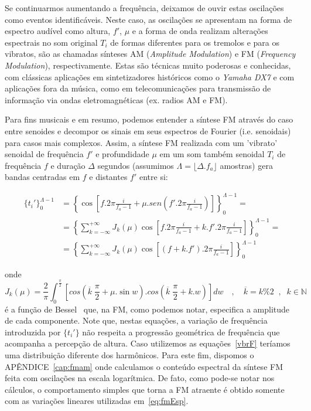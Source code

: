Se continuarmos aumentando a frequência, deixamos de ouvir estas oscilações
como eventos identificáveis. Neste caso, as oscilações se apresentam na forma de espectro
audível como altura, $f'$, $\mu$ e a forma de onda realizam alterações espectrais no som
original $T_i$ de formas diferentes para os tremolos e para os vibratos, são as 
chamadas sínteses AM (\emph{Amplitude Modulation}) e FM (\emph{Frequency Modulation}), respectivamente.
Estas são técnicas muito poderosas e conhecidas, com clássicas aplicações em sintetizadores
históricos como o \emph{Yamaha DX7} e com aplicações fora da música, como em telecomunicações para transmissão de informação via ondas eletromagnéticas (ex. radios AM e FM).

Para fins musicais e em resumo, podemos entender a síntese FM através do caso entre senoides
e decompor os sinais em seus espectros de Fourier (i.e. senoidais) para casos mais complexos.
Assim, a síntese FM realizada com um 'vibrato' senoidal de frequência $f'$ e profundidade $\mu$ em um som também senoidal $T_i$ de frequência $f$
e duração $\Delta$ segundos (assumimos $\Lambda = \lfloor \Delta . f_a \rfloor $ amostras)
gera bandas centradas em $f$ e distantes $f'$ entre si:

\begin{equation}\label{eq:fmEsp}
\begin{split}
\{t_i'\}_0^{\Lambda -1} & = \left \{ \cos \left [f . 2 \pi \frac{i}{f_a-1} + \mu . sen \left ( f' . 2 \pi \frac{i}{ f_a -1 } \right ) \right ] \right \}_0^{\Lambda-1}  = \\
 & = \left \{ \sum_{k=-\infty}^{+\infty} J_k(\mu) \cos \left [ f . 2 \pi \frac{i}{f_a-1} + k . f' . 2 \pi \frac{i}{f_a-1} \right ]  \right \}_0^{\Lambda-1} = \\
 & = \left \{ \sum_{k=-\infty}^{+\infty} J_k(\mu) \cos \left [ (f+k.f') . 2 \pi \frac{i}{f_a-1} \right ]  \right \}_0^{\Lambda-1}
\end{split}
\end{equation}

onde 
\begin{equation}
J_k(\mu) = \frac{2}{\pi} \int_0^{\frac{\pi}{2}}\left [ cos \left (\overline{k}\;\frac{\pi}{2} + \mu . \sin w \right ) . cos \left ( \overline{k}\;\frac{\pi}{2} + k . w \right ) \right ] dw \quad , \quad \overline{k} = k \% 2 \;\;,\;\; k \in \mathbb{N}
\end{equation}
é a função de Bessel~\cite{BesselCCRMA,JOSFM} que, na FM, como podemos notar, especifica a amplitude de cada componente. Note que, nestas equações, a variação de frequência introduzida por $\{t_i'\}$ não respeita a progressão geométrica de frequência que acompanha a percepção de altura. Caso utilizemos as equações~\ref{vbrF} teríamos uma distribuição diferente dos harmônicos. Para este fim, dispomos o APÊNDICE~\ref{cap:fmam} onde calculamos o conteúdo espectral da síntese FM feita com oscilações na escala logarítmica. De fato, como pode-se notar nos cálculos, o comportamento simples que torna a FM atraente é obtido somente com as variações lineares utilizadas em~\ref{eq:fmEsp}.

